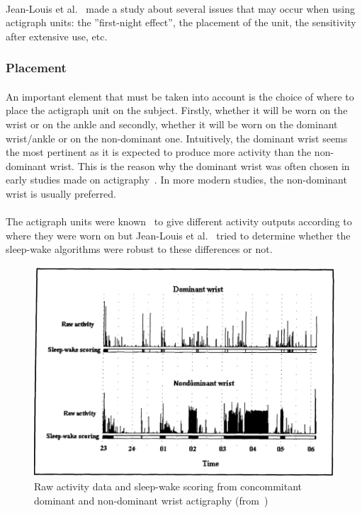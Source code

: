\documentclass[a4paper,12pt]{article}
\begin{document}
\paragraph{}
Jean-Louis et al.~\cite{Jean-Louis1997a} made a study about several issues that may occur when using actigraph units: the ''first-night effect'', the placement of the unit, the sensitivity after extensive use, etc.

\subsubsection{Placement}

\paragraph{}
An important element that must be taken into account is the choice of where to place the actigraph unit on the subject. Firstly, whether it will be worn on the wrist or on the ankle and secondly, whether it will be worn on the dominant wrist/ankle or on the non-dominant one. Intuitively, the dominant wrist seems the most pertinent as it is expected to produce more activity than the non-dominant wrist. This is the reason why the dominant wrist was often chosen in early studies made on actigraphy~\cite{Mullaney1980}. In more modern studies, the non-dominant wrist is usually preferred.~\cite{Crespo2012}\cite{Pires2009}

\paragraph{}
The actigraph units were known~\cite{Sadeh1994} to give different activity outputs according to where they were worn on but Jean-Louis et al.~\cite{Jean-Louis1997a} tried to determine whether the sleep-wake algorithms were robust to these differences or not.

\begin{figure}[H]
\centering
\includegraphics[scale=0.4]{Images/actiPlacement2.png}
\caption{Raw activity data and sleep-wake scoring from concommitant dominant and non-dominant wrist actigraphy (from~\cite{Sadeh1994})}
\label{actiPlacement2}
\end{figure}
\end{document}
